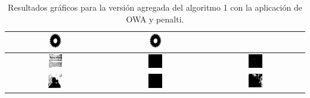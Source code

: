 \begin{table}
\begin{tabular}{c|c|c}
\includegraphics[width=0.15\textwidth]{img/res/e6/alg1agregadoowa202.jpg} &
\includegraphics[width=0.15\textwidth]{img/res/e6/alg1agregadoowa302.jpg} \\\hline
\includegraphics[width=0.15\textwidth]{img/res/e6/alg1agregadoowa109.jpg} &
\includegraphics[width=0.15\textwidth]{img/res/e6/alg1agregadoowa209.jpg} &
\includegraphics[width=0.15\textwidth]{img/res/e6/alg1agregadoowa309.jpg} \\\hline
\includegraphics[width=0.15\textwidth]{img/res/e6/alg1agregadoowa107.jpg} &
\includegraphics[width=0.15\textwidth]{img/res/e6/alg1agregadoowa207.jpg} &
\includegraphics[width=0.15\textwidth]{img/res/e6/alg1agregadoowa307.jpg} \\\hline
\end{tabular}
\caption{Resultados gráficos para la versión agregada del algoritmo 1 con la aplicación de OWA y penalti. \label{tab:resultexp6imagenes}}
\end{table}



